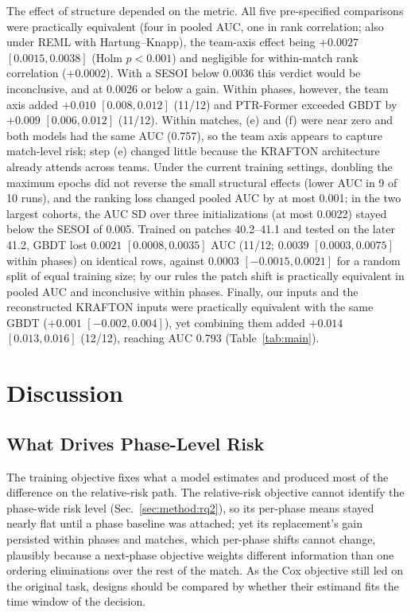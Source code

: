 \documentclass[conference]{IEEEtran}
\begin{document}
The effect of structure depended on the metric.
All five pre-specified comparisons were practically equivalent (four in pooled AUC, one in rank correlation; also under REML with Hartung--Knapp), the team-axis effect being $+0.0027$ $[0.0015, 0.0038]$ (Holm $p<0.001$) and negligible for within-match rank correlation ($+0.0002$). With a SESOI below 0.0036 this verdict would be inconclusive, and at 0.0026 or below a gain.
Within phases, however, the team axis added $+0.010$ $[0.008, 0.012]$ (11/12) and PTR-Former exceeded GBDT by $+0.009$ $[0.006, 0.012]$ (11/12).
Within matches, (e) and (f) were near zero and both models had the same AUC (0.757), so the team axis appears to capture match-level risk; step (e) changed little because the KRAFTON architecture already attends across teams.
Under the current training settings, doubling the maximum epochs did not reverse the small structural effects (lower AUC in 9 of 10 runs), and the ranking loss changed pooled AUC by at most 0.001; in the two largest cohorts, the AUC SD over three initializations (at most 0.0022) stayed below the SESOI of 0.005.
Trained on patches 40.2--41.1 and tested on the later 41.2, GBDT lost $0.0021$ $[0.0008, 0.0035]$ AUC (11/12; $0.0039$ $[0.0003, 0.0075]$ within phases) on identical rows, against $0.0003$ $[-0.0015, 0.0021]$ for a random split of equal training size; by our rules the patch shift is practically equivalent in pooled AUC and inconclusive within phases.
Finally, our inputs and the reconstructed KRAFTON inputs were practically equivalent with the same GBDT ($+0.001$ $[-0.002, 0.004]$), yet combining them added $+0.014$ $[0.013, 0.016]$ (12/12), reaching AUC 0.793 (Table~\ref{tab:main}).

\section{Discussion}
\label{sec:discussion}

\subsection{What Drives Phase-Level Risk}
\label{sec:discussion:drivers}
The training objective fixes what a model estimates and produced most of the difference on the relative-risk path.
The relative-risk objective cannot identify the phase-wide risk level (Sec.~\ref{sec:method:rq2}), so its per-phase means stayed nearly flat until a phase baseline was attached; yet its replacement's gain persisted within phases and matches, which per-phase shifts cannot change, plausibly because a next-phase objective weights different information than one ordering eliminations over the rest of the match.
As the Cox objective still led on the original task, designs should be compared by whether their estimand fits the time window of the decision.
\end{document}
